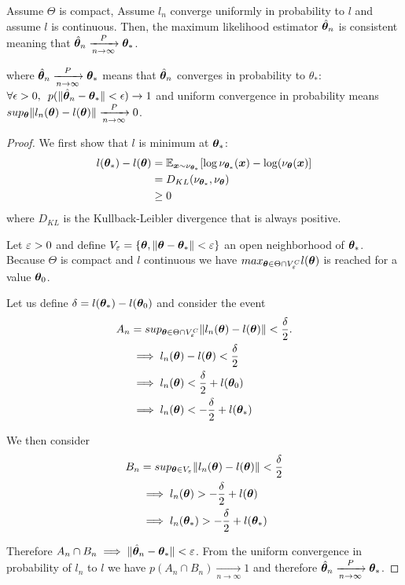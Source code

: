 \begin{prop}
  \label{prop:mse_consistent}
  Assume $\Theta$ is compact, 
  Assume $l_n$ converge uniformly in probability to $l$
  and assume $l$ is continuous.
  Then, the maximum likelihood estimator  $\hat{\boldsymbol{\theta}}_n$ is consistent
  meaning that $\hat{\boldsymbol{\theta}}_n \xrightarrow[n \rightarrow \infty]{P}  \boldsymbol{\theta}_*$.
\end{prop}
where $\hat{\boldsymbol{\theta}}_n \xrightarrow[n \rightarrow \infty]{P}  \boldsymbol{\theta}_*$ means
that $\hat{\boldsymbol{\theta}}_n$ converges in probability to $\theta_*$:  $\forall \epsilon > 0, \enspace p(\| \hat{\boldsymbol{\theta}}_n - \boldsymbol{\theta}_* \| < \epsilon) \rightarrow 1$
and uniform convergence in probability means $sup_{\boldsymbol{\theta}} \|l_n(\boldsymbol{\theta}) -
l(\boldsymbol{\theta})\| \xrightarrow[n \rightarrow \infty]{P} 0$.
\begin{proof}
  We first show that $l$ is minimum at $\boldsymbol{\theta}_*$:
  \begin{align}
    l(\boldsymbol{\theta}_*) - l(\boldsymbol{\theta}) &= \mathbb{E}_{\boldsymbol{x} \sim \nu_{\boldsymbol{\theta}_*}}[\log \nu_{\boldsymbol{\theta}_*}(\boldsymbol{x}) - \log(\nu_{\boldsymbol{\theta}}(\boldsymbol{x})] \\
                            &= D_{KL}(\nu_{\boldsymbol{\theta}_*}, \nu_{\boldsymbol{\theta}}) \\
                            &\geq 0
  \end{align}
  where $D_{KL}$ is the Kullback-Leibler divergence that is always positive.

  Let $\varepsilon > 0$ and define $V_{\varepsilon} = \{\boldsymbol{\theta}, \|\boldsymbol{\theta} - \boldsymbol{\theta}_*\| <
  \varepsilon\}$ an open neighborhood of $\boldsymbol{\theta}_*$.
  Because $\Theta$ is compact and $l$ continuous we have $max_{\boldsymbol{\theta} \in \Theta
    \cap V_{\varepsilon}^C} l(\boldsymbol{\theta})$ is reached for a value $\boldsymbol{\theta}_0$.
  
  Let us define $\delta = l(\boldsymbol{\theta}_*) - l(\boldsymbol{\theta}_0)$ and consider the event
  \begin{align}
    A_n &= sup_{\boldsymbol{\theta} \in \Theta \cap V_{\varepsilon}^C} \|l_n(\boldsymbol{\theta}) - l(\boldsymbol{\theta})\| < \frac{\delta}{2}. \\
    &\implies l_n(\boldsymbol{\theta}) - l(\boldsymbol{\theta}) < \frac{\delta}{2} \\
    &\implies l_n(\boldsymbol{\theta}) < \frac{\delta}{2} + l(\boldsymbol{\theta}_0) \\
    &\implies l_n(\boldsymbol{\theta}) < -\frac{\delta}{2} + l(\boldsymbol{\theta}_*)
  \end{align}

  We then consider 
  \begin{align}
    B_n &= sup_{\boldsymbol{\theta} \in V_{\varepsilon}} \|l_n(\boldsymbol{\theta}) - l(\boldsymbol{\theta})\| < \frac{\delta}{2} \\
        &\implies l_n(\boldsymbol{\theta}) > -\frac{\delta}{2} + l(\boldsymbol{\theta}) \\
        &\implies l_n(\boldsymbol{\theta}_*) > -\frac{\delta}{2} + l(\boldsymbol{\theta}_*) \\
  \end{align}

  Therefore $A_n \cap B_n \implies \|\hat{\boldsymbol{\theta}}_n - \boldsymbol{\theta}_* \| < \varepsilon$.
  From the uniform convergence in probability of $l_n$ to $l$ we have
  $p(A_n \cap B_n) \xrightarrow[n \rightarrow \infty]{} 1$ and therefore $\hat{\boldsymbol{\theta}}_n \xrightarrow[n \rightarrow \infty]{P} \boldsymbol{\theta}_*$.
\end{proof}


